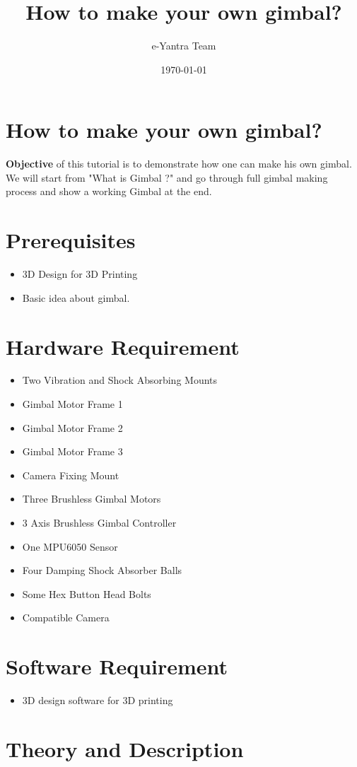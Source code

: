 \documentclass[11pt,a4paper]{article}
\title{How to make your own gimbal?}
\author{e-Yantra Team}
\date{\today}
\begin{document}
	\maketitle
	\newpage
	\tableofcontents
	\newpage
	\section{How to make your own gimbal?}
	\textbf{Objective} of this tutorial is to demonstrate how one can make his own gimbal. We will start from "What is Gimbal ?" and go through full gimbal making process and show a working Gimbal at the end.
	\section{Prerequisites}
	\begin{itemize}
		\item 3D Design for 3D Printing
		\item Basic idea about gimbal.
	\end{itemize}
	\section{Hardware Requirement}
	\begin{itemize}
		\item Two Vibration and Shock Absorbing Mounts
		\item Gimbal Motor Frame 1
		\item Gimbal Motor Frame 2
		\item Gimbal Motor Frame 3
		\item Camera Fixing Mount
		\item Three Brushless Gimbal Motors
		\item 3 Axis Brushless Gimbal Controller
		\item One MPU6050  Sensor
		\item Four Damping Shock Absorber Balls
		\item Some Hex Button Head Bolts
		\item Compatible Camera
	\end{itemize}
	\section{Software Requirement}
	\begin{itemize}
		\item 3D design software for 3D printing
	\end{itemize}
	\section{Theory and Description}
		
\end{document}
